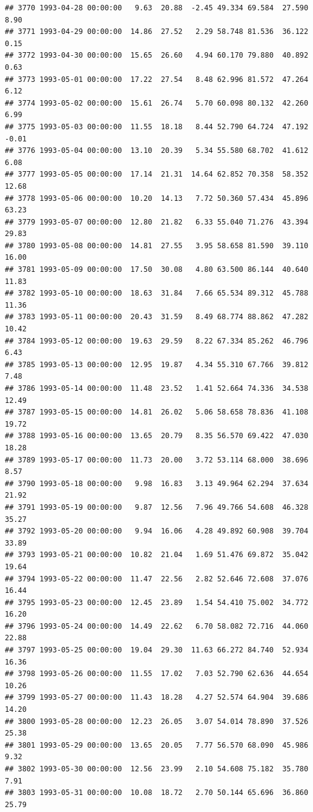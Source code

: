 \documentclass{article}\usepackage{graphicx, color}
\makeatletter
\newenvironment{kframe}{%
 \def\at@end@of@kframe{}%
 \ifinner\ifhmode%
  \def\at@end@of@kframe{\end{minipage}}%
  \begin{minipage}{\columnwidth}%
 \fi\fi%
 \def\FrameCommand##1{\hskip\@totalleftmargin \hskip-\fboxsep
 \colorbox{shadecolor}{##1}\hskip-\fboxsep
     \hskip-\linewidth \hskip-\@totalleftmargin \hskip\columnwidth}%
 \MakeFramed {\advance\hsize-\width
   \@totalleftmargin\z@ \linewidth\hsize
   \@setminipage}}%
 {\par\unskip\endMakeFramed%
 \at@end@of@kframe}
\newenvironment{knitrout}{}{} %
\makeatother
\begin{document}
\begin{knitrout}
\begin{kframe}
\begin{verbatim}
## 3770 1993-04-28 00:00:00   9.63  20.88  -2.45 49.334 69.584  27.590   8.90
## 3771 1993-04-29 00:00:00  14.86  27.52   2.29 58.748 81.536  36.122   0.15
## 3772 1993-04-30 00:00:00  15.65  26.60   4.94 60.170 79.880  40.892   0.63
## 3773 1993-05-01 00:00:00  17.22  27.54   8.48 62.996 81.572  47.264   6.12
## 3774 1993-05-02 00:00:00  15.61  26.74   5.70 60.098 80.132  42.260   6.99
## 3775 1993-05-03 00:00:00  11.55  18.18   8.44 52.790 64.724  47.192  -0.01
## 3776 1993-05-04 00:00:00  13.10  20.39   5.34 55.580 68.702  41.612   6.08
## 3777 1993-05-05 00:00:00  17.14  21.31  14.64 62.852 70.358  58.352  12.68
## 3778 1993-05-06 00:00:00  10.20  14.13   7.72 50.360 57.434  45.896  63.23
## 3779 1993-05-07 00:00:00  12.80  21.82   6.33 55.040 71.276  43.394  29.83
## 3780 1993-05-08 00:00:00  14.81  27.55   3.95 58.658 81.590  39.110  16.00
## 3781 1993-05-09 00:00:00  17.50  30.08   4.80 63.500 86.144  40.640  11.83
## 3782 1993-05-10 00:00:00  18.63  31.84   7.66 65.534 89.312  45.788  11.36
## 3783 1993-05-11 00:00:00  20.43  31.59   8.49 68.774 88.862  47.282  10.42
## 3784 1993-05-12 00:00:00  19.63  29.59   8.22 67.334 85.262  46.796   6.43
## 3785 1993-05-13 00:00:00  12.95  19.87   4.34 55.310 67.766  39.812   7.48
## 3786 1993-05-14 00:00:00  11.48  23.52   1.41 52.664 74.336  34.538  12.49
## 3787 1993-05-15 00:00:00  14.81  26.02   5.06 58.658 78.836  41.108  19.72
## 3788 1993-05-16 00:00:00  13.65  20.79   8.35 56.570 69.422  47.030  18.28
## 3789 1993-05-17 00:00:00  11.73  20.00   3.72 53.114 68.000  38.696   8.57
## 3790 1993-05-18 00:00:00   9.98  16.83   3.13 49.964 62.294  37.634  21.92
## 3791 1993-05-19 00:00:00   9.87  12.56   7.96 49.766 54.608  46.328  35.27
## 3792 1993-05-20 00:00:00   9.94  16.06   4.28 49.892 60.908  39.704  33.89
## 3793 1993-05-21 00:00:00  10.82  21.04   1.69 51.476 69.872  35.042  19.64
## 3794 1993-05-22 00:00:00  11.47  22.56   2.82 52.646 72.608  37.076  16.44
## 3795 1993-05-23 00:00:00  12.45  23.89   1.54 54.410 75.002  34.772  16.20
## 3796 1993-05-24 00:00:00  14.49  22.62   6.70 58.082 72.716  44.060  22.88
## 3797 1993-05-25 00:00:00  19.04  29.30  11.63 66.272 84.740  52.934  16.36
## 3798 1993-05-26 00:00:00  11.55  17.02   7.03 52.790 62.636  44.654  10.26
## 3799 1993-05-27 00:00:00  11.43  18.28   4.27 52.574 64.904  39.686  14.20
## 3800 1993-05-28 00:00:00  12.23  26.05   3.07 54.014 78.890  37.526  25.38
## 3801 1993-05-29 00:00:00  13.65  20.05   7.77 56.570 68.090  45.986   9.32
## 3802 1993-05-30 00:00:00  12.56  23.99   2.10 54.608 75.182  35.780   7.91
## 3803 1993-05-31 00:00:00  10.08  18.72   2.70 50.144 65.696  36.860  25.79

\end{verbatim}
\end{kframe}
\end{knitrout}
\end{document}
